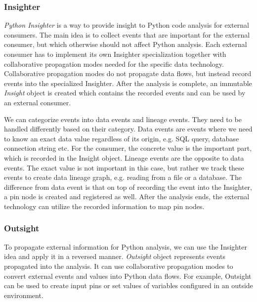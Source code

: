 \subsubsection{Insighter}
\textit{Python Insighter} is a way to provide insight to Python code analysis for external consumers. The main idea is to collect events that are important for the external consumer, but which otherwise should not affect Python analysis. Each external consumer has to implement its own Insighter specialization together with collaborative propagation modes needed for the specific data technology. Collaborative propagation modes do not propagate data flows, but instead record events into the specialized Insighter. After the analysis is complete, an immutable \textit{Insight} object is created which contains the recorded events and can be used by an external consumer.
\par
We can categorize events into data events and lineage events. They need to be handled differently based on their category. Data events are events where we need to know an exact data value regardless of its origin, e.g. SQL query, database connection string etc. For the consumer, the concrete value is the important part, which is recorded in the Insight object. Lineage events are the opposite to data events. The exact value is not important in this case, but rather we track these events to create data lineage graph, e.g. reading from a file or a database. The difference from data event is that on top of recording the event into the Insighter, a pin node is created and registered as well. After the analysis ends, the external technology can utilize the recorded information to map pin nodes.

\subsubsection{Outsight}

To propagate external information for Python analysis, we can use the Insighter idea and apply it in a reversed manner. \textit{Outsight} object represents events propagated into the analysis. It can use collaborative propagation modes to convert external events and values into Python data flows. For example, Outsight can be used to create input pins or set values of variables configured in an outside environment.

